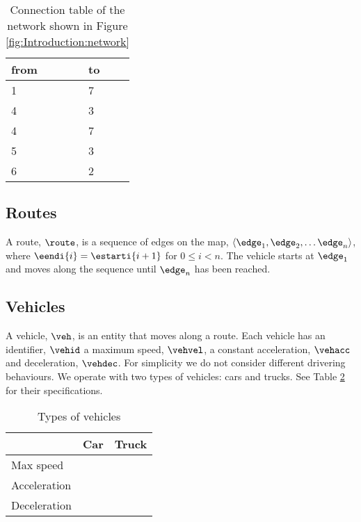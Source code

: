 \begin{table}[h]
\centering
\begin{tabular}{|l|l|}
\hline
from & to \\ \hline
1 & 7 \\ \hline
4 & 3 \\ \hline
4 & 7 \\ \hline
5 & 3 \\ \hline
6 & 2 \\ \hline
\end{tabular}
\caption{Connection table of the network shown in Figure \ref{fig:Introduction:network} }
\label{tab:Introduction:connectionTable}
\end{table}

\begin{comment}
\subsection{Trajectory}
A trajectory, $T$, is a sequence of connected edges on the map, $\langle e_1, e_2, \dots e_n \rangle$, where $e_i.v_2 = e_{i+1}.v_1$ for $0\leq i< n$.
The vehicle starts at $e_1$ and moves along the sequence until $e_n$ has been reached.
\end{comment}

\subsection{Routes}
A route, $\route$, is a sequence of edges on the map, $\langle \edge_1, \edge_2, \dots \edge_n \rangle$, where $\eendi{i} = \estarti{i+1}$ for $0\leq i< n$.
The vehicle starts at $\edge_1$ and moves along the sequence until $\edge_n$ has been reached.

\subsection{Vehicles}
A vehicle, $\veh$, is an entity that moves along a route.
Each vehicle has an identifier, $\vehid$ a maximum speed, $\vehvel$, a constant acceleration, $\vehacc$ and deceleration, $\vehdec$.
For simplicity we do not consider different drivering behaviours.
We operate with two types of vehicles: cars and trucks. See Table \ref{table.vehicleTypes} for their specifications.
\begin{table}
\centering
\begin{tabular}{|l|l|l|}\hline
		& Car	& Truck \\\hline
Max speed 	& 	& \\\hline
Acceleration 	&	& \\\hline
Deceleration 	&	& \\\hline
\end{tabular}
\caption{Types of vehicles}\label{table.vehicleTypes}
\end{table}

